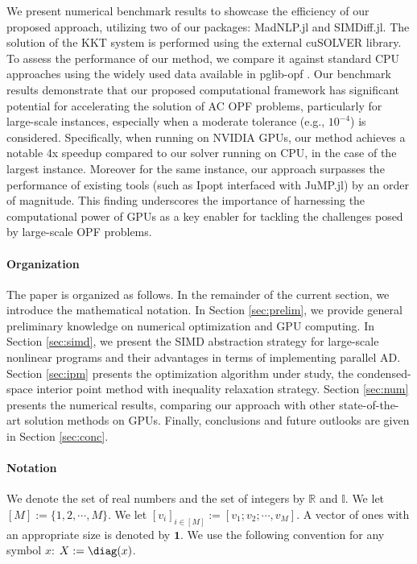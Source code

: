 We present numerical benchmark results to showcase the efficiency of
our proposed approach, utilizing two of our packages: MadNLP.jl and
SIMDiff.jl. The solution of the KKT system is performed using the
external cuSOLVER library. To assess the performance of our method, we
compare it against standard CPU approaches using the widely used data
available in pglib-opf \cite{wachter2006implementation}.  Our
benchmark results demonstrate that our proposed computational
framework has significant potential for accelerating the solution of
AC OPF problems, particularly for large-scale instances, especially
when a moderate tolerance (e.g., $10^{-4}$) is
considered. Specifically, when running on NVIDIA GPUs, our method
achieves a notable 4x speedup compared to our solver running on CPU,
in the case of the largest instance. Moreover for the same instance,
our approach surpasses the performance of existing tools (such as
Ipopt interfaced with JuMP.jl) by an order of magnitude.  This finding
underscores the importance of harnessing the computational power of
GPUs as a key enabler for tackling the challenges posed by large-scale
OPF problems. 


\paragraph*{Organization}
The paper is organized as follows. In the remainder of the current
section, we introduce the mathematical notation. In Section
\ref{sec:prelim}, we provide general preliminary knowledge on
numerical optimization and GPU computing. In Section \ref{sec:simd},
we present the SIMD abstraction strategy for large-scale nonlinear
programs and their advantages in terms of implementing parallel
AD. Section \ref{sec:ipm} presents the
optimization algorithm under study, the condensed-space interior point
method with inequality relaxation strategy. Section \ref{sec:num}
presents the numerical results, comparing our approach with other
state-of-the-art solution methods on GPUs. Finally, conclusions and
future outlooks are given in Section \ref{sec:conc}.

\paragraph*{Notation}
We denote the set of real numbers and the set of integers by
$\mathbb{R}$ and $\mathbb{I}$. We let $[M]:=\{1,2,\cdots,M\}$. We let
$[v_i]_{i\in[M]}:=[v_1;v_2;\cdots,v_M]$.  A vector of ones with an
appropriate size is denoted by $\boldsymbol{1}$. We use the following
convention for any symbol $x$: $X:=\diag(x)$.

